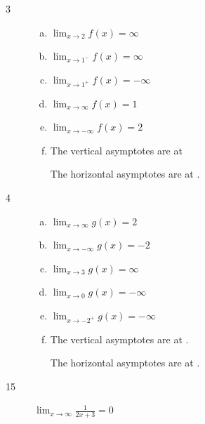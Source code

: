 \documentclass[letterpaper]{exam}
\begin{document}
    \begin{description}

      \item[3] 
        \begin{enumerate}[(a)]
          \item $\lim_{x \to 2} f(x) = \boxed{ \infty }$

          \item $\lim_{x \to 1^-} f(x) = \boxed{ \infty }$

          \item $\lim_{x \to 1^+} f(x) = \boxed{ -\infty }$

          \item $\lim_{x \to \infty} f(x) = \boxed{ 1 }$

          \item $\lim_{x \to -\infty} f(x) = \boxed{ 2 }$

          \item The vertical asymptotes are at 

            The horizontal asymptotes are at .

        \end{enumerate}

      \item[4] 
        \begin{enumerate}[(a)]
          \item $\lim_{x \to \infty} g(x) = \boxed{ 2 }$

          \item $\lim_{x \to -\infty} g(x) = \boxed{ -2 }$

          \item $\lim_{x \to 3} g(x) = \boxed{ \infty }$

          \item $\lim_{x \to 0} g(x) = \boxed{ -\infty }$

          \item $\lim_{x \to -2^+} g(x) = \boxed{ -\infty }$

          \item The vertical asymptotes are at .

            The horizontal asymptotes are at .

        \end{enumerate}

      \item[15] 
        $\lim_{x \to \infty} \frac{1}{2x + 3} = \boxed{ 0 }$


\end{description}
\end{document}
